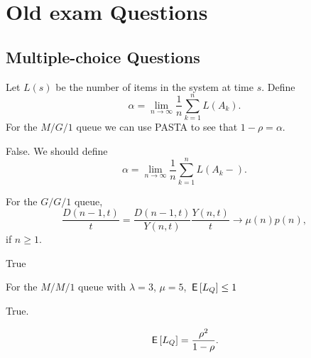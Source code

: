 \section{Old exam Questions}

\subsection{Multiple-choice Questions}

\begin{exercise}[201703]
Let $L(s)$ be the number of items in the system at time $s$. 
Define 
\begin{equation*}
\alpha = \lim_{n\to\infty} \frac 1 n \sum_{k=1}^n L(A_k).
\end{equation*}
For the $M/G/1$ queue we can use PASTA to see  that $1-\rho = \alpha$.

\begin{solution} False.
We should define
\begin{equation*}
\alpha = \lim_{n\to\infty} \frac 1 n \sum_{k=1}^n L(A_k-).
\end{equation*}
\end{solution}
\end{exercise}

\begin{exercise}[201703]
For the $G/G/1$ queue,
\begin{equation}
  \frac{D(n-1,t)}t =   \frac{D(n-1,t)}{Y(n,t)}\frac{Y(n,t)}t \to \mu(n) p(n),
\end{equation}
if $n\geq 1$.

\begin{solution}
    True
\end{solution}
\end{exercise}

\begin{exercise}[201703]
  For the $M/M/1$ queue with $\lambda=3$, $\mu=5$, $\,\mathsf{E}\left[L_Q\right] \leq 1$

\begin{solution}
    True.

    \begin{equation*}
\,\mathsf{E}\left[L_Q\right] = \frac{\rho^2}{1-\rho}.
    \end{equation*}
\end{solution}
\end{exercise}


